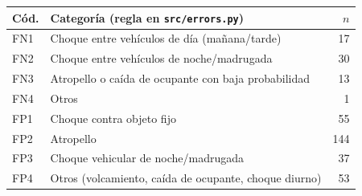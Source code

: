 \begin{tabular}{@{}llr@{}}
\toprule
Cód. & Categoría (regla en \texttt{src/errors.py}) & $n$ \\
\midrule
FN1 & Choque entre vehículos de día (mañana/tarde) & 17 \\
FN2 & Choque entre vehículos de noche/madrugada & 30 \\
FN3 & Atropello o caída de ocupante con baja probabilidad & 13 \\
FN4 & Otros & 1 \\
FP1 & Choque contra objeto fijo & 55 \\
FP2 & Atropello & 144 \\
FP3 & Choque vehicular de noche/madrugada & 37 \\
FP4 & Otros (volcamiento, caída de ocupante, choque diurno) & 53 \\
\bottomrule
\end{tabular}
